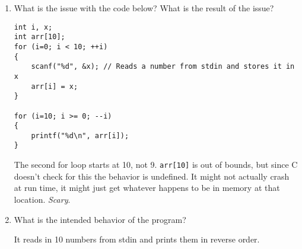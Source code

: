 \begin{enumerate}
\item What is the issue with the code below? What is the result of the issue?

\begin{lstlisting}
int i, x;
int arr[10];
for (i=0; i < 10; ++i)
{
	scanf("%d", &x); // Reads a number from stdin and stores it in x
	arr[i] = x;
}

for (i=10; i >= 0; --i)
{
	printf("%d\n", arr[i]);
}
\end{lstlisting}
\begin{answer}
The second for loop starts at 10, not 9.
\texttt{arr[10]} is out of bounds, but since C doesn't check for this the behavior is undefined.
It might not actually crash at run time, it might just get whatever happens to be in memory at that location.
\emph{Scary}.
\end{answer}

\item What is the intended behavior of the program?

\begin{answer}
It reads in 10 numbers from stdin and prints them in reverse order.
\end{answer}

\end{enumerate}
